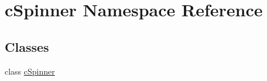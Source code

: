 \hypertarget{namespacecSpinner}{\section{c\-Spinner \-Namespace \-Reference}
\label{namespacecSpinner}
}
\subsection*{\-Classes}
\begin{DoxyCompactItemize}
\item 
class \hyperlink{classcSpinner_1_1cSpinner}{c\-Spinner}
\end{DoxyCompactItemize}
